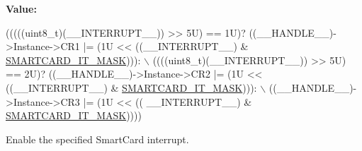 {\bfseries Value\+:}
\begin{DoxyCode}
(((((uint8\_t)(\_\_INTERRUPT\_\_)) >> 5U) == 1U)? ((\_\_HANDLE\_\_)->Instance->CR1 |= (1U << ((\_\_INTERRUPT\_\_) & 
      \hyperlink{group___s_m_a_r_t_c_a_r_d___interruption___mask_ga2d4be8e0259fd370f82c53579c96ede5}{SMARTCARD\_IT\_MASK}))): \(\backslash\)
                                                                ((((uint8\_t)(\_\_INTERRUPT\_\_)) >> 5U) == 2U)?
       ((\_\_HANDLE\_\_)->Instance->CR2 |= (1U << ((\_\_INTERRUPT\_\_) & \hyperlink{group___s_m_a_r_t_c_a_r_d___interruption___mask_ga2d4be8e0259fd370f82c53579c96ede5}{SMARTCARD\_IT\_MASK}))): \(\backslash\)
                                                                ((\_\_HANDLE\_\_)->Instance->CR3 |= (1U << ((
      \_\_INTERRUPT\_\_) & \hyperlink{group___s_m_a_r_t_c_a_r_d___interruption___mask_ga2d4be8e0259fd370f82c53579c96ede5}{SMARTCARD\_IT\_MASK}))))
\end{DoxyCode}


Enable the specified Smart\+Card interrupt. 


